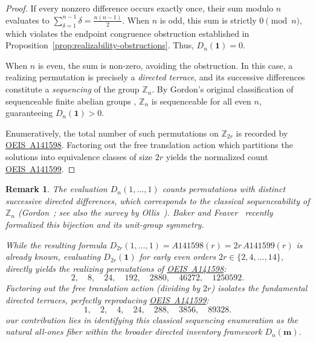 \documentclass[11pt,a4paper]{amsart}
\newtheorem{remark}[theorem]{Remark}
\newcommand{\1}{\mathbf{1}}
\begin{document}
\begin{proof}
If every nonzero difference occurs exactly once, their sum modulo $n$ evaluates to $\sum_{\delta=1}^{n-1} \delta = \frac{n(n-1)}{2}$. When $n$ is odd, this sum is strictly $0 \pmod n$, which violates the endpoint congruence obstruction established in Proposition~\ref{prop:realizability-obstructions}. Thus, $D_n(\bm{1}) = 0$.

When $n$ is even, the sum is non-zero, avoiding the obstruction. In this case, a realizing permutation is precisely a \emph{directed terrace}, and its successive differences constitute a \emph{sequencing} of the group $\mathbb{Z}_n$. By Gordon's original classification of sequenceable finite abelian groups \cite{Gordon1961}, $\mathbb{Z}_n$ is sequenceable for all even $n$, guaranteeing $D_n(\bm{1}) > 0$. 

Enumeratively, the total number of such permutations on $\mathbb{Z}_{2r}$ is recorded by \href{https://oeis.org/A141598}{OEIS~A141598}. Factoring out the free translation action which partitions the solutions into equivalence classes of size $2r$ yields the normalized count \href{https://oeis.org/A141599}{OEIS~A141599}.
\end{proof}
\begin{remark}\label{rem:all-ones-fiber}
The evaluation $D_n(1, \ldots, 1)$ counts permutations with distinct successive directed differences, which corresponds to the classical sequenceability of $\mathbb{Z}_n$ (Gordon~\cite{Gordon1961}; see also the survey by Ollis~\cite{Ollis2025}). Baker and Feaver~\cite[Theorem~1, Lemma~2]{BakerFeaver2026} recently formalized this bijection and its unit-group symmetry. 

While the resulting formula $D_{2r}(1, \ldots, 1) = A141598(r) = 2r\,A141599(r)$ is already known, evaluating $D_{2r}(\bm{1})$ for early even orders $2r \in \{2, 4, \dots, 14\}$,  directly yields the realizing permutations of \href{https://oeis.org/A141598}{OEIS~A141598}:
\begin{equation*}
    2, \quad 8, \quad 24, \quad 192, \quad 2880, \quad 46272, \quad 1250592.
\end{equation*}
Factoring out the free translation action (dividing by $2r$) isolates the fundamental directed terraces, perfectly reproducing \href{https://oeis.org/A141599}{OEIS~A141599}:
\begin{equation*}
    1, \quad 2, \quad 4, \quad 24, \quad 288, \quad 3856, \quad 89328.
\end{equation*}
 our contribution lies in identifying this classical sequencing enumeration as the natural all-ones fiber within the broader directed inventory framework $D_n(\mathbf{m})$.
\end{remark}
 
\end{document}
